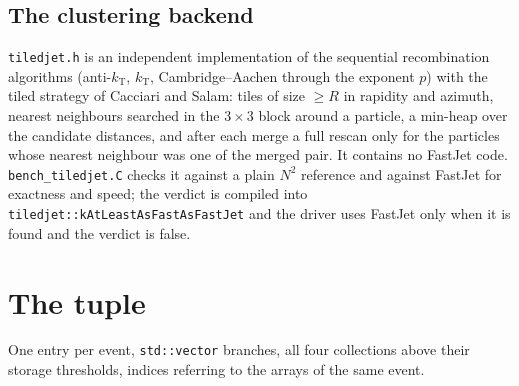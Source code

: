 \subsection{The clustering backend}
\label{s:backend}
\texttt{tiledjet.h} is an independent implementation of the sequential
recombination algorithms (anti-$k_{\mathrm T}$, $k_{\mathrm T}$,
Cambridge--Aachen through the exponent $p$) with the tiled strategy of
Cacciari and Salam: tiles of size $\ge R$ in rapidity and azimuth, nearest
neighbours searched in the $3\times3$ block around a particle, a min-heap over
the candidate distances, and after each merge a full rescan only for the
particles whose nearest neighbour was one of the merged pair. It contains no
FastJet code. \texttt{bench\_tiledjet.C} checks it against a plain $N^2$
reference and against FastJet for exactness and speed; the verdict is compiled
into \texttt{tiledjet::kAtLeastAsFastAsFastJet} and the driver uses FastJet
only when it is found and the verdict is false. 

\section{The tuple}
\label{s:tuple}
One entry per event, \texttt{std::vector} branches, all four collections above
their storage thresholds, indices referring to the arrays of the same event.

